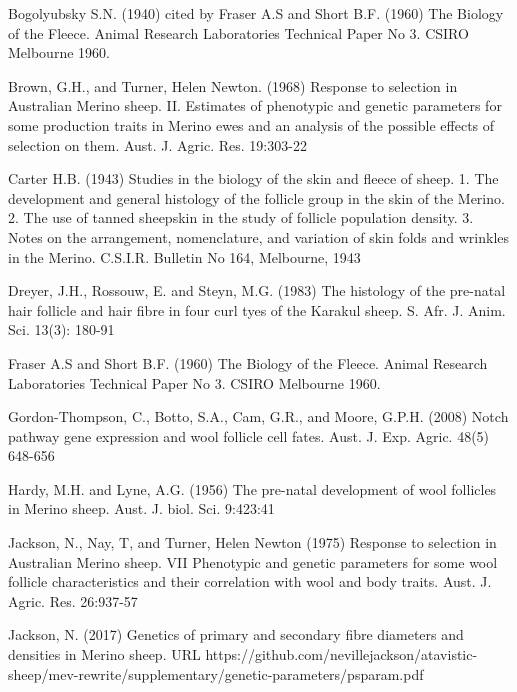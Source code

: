 \documentclass[titlepage]{article}  %
\begin{document}
\clearpage

\begin{thebibliography}{99}

 Bogolyubsky S.N. (1940) cited by Fraser A.S and Short B.F. (1960) The Biology of the Fleece. Animal Research Laboratories Technical Paper No 3. CSIRO Melbourne 1960.

Brown, G.H., and Turner, Helen Newton. (1968) Response to selection in Australian Merino sheep. II. Estimates of phenotypic and genetic parameters for some production traits in Merino ewes and an analysis of the possible effects of selection on them. Aust. J. Agric. Res. 19:303-22

Carter H.B. (1943) Studies in the biology of the skin and fleece of sheep. 1. The development and general histology of the follicle group in the skin of the Merino. 2. The use of tanned sheepskin in the study of follicle population density. 3. Notes on the arrangement, nomenclature, and variation of skin folds and wrinkles in the Merino. C.S.I.R. Bulletin No 164, Melbourne, 1943

Dreyer, J.H., Rossouw, E. and Steyn, M.G. (1983) The histology of the pre-natal hair follicle and hair fibre in four curl tyes of the Karakul sheep.  S. Afr. J. Anim. Sci. 13(3): 180-91

Fraser A.S and Short B.F. (1960) The Biology of the Fleece. Animal Research Laboratories Technical Paper No 3. CSIRO Melbourne 1960.

Gordon-Thompson, C., Botto, S.A., Cam, G.R., and Moore, G.P.H. (2008) Notch pathway gene expression and wool follicle cell fates. Aust. J. Exp. Agric. 48(5) 648-656

Hardy, M.H. and Lyne, A.G. (1956) The pre-natal development of wool follicles in Merino sheep. Aust. J. biol. Sci. 9:423:41

Jackson, N., Nay, T, and Turner, Helen Newton (1975) Response to selection in Australian Merino sheep. VII Phenotypic and genetic parameters for some wool follicle characteristics and their correlation with wool and body traits. Aust. J. Agric. Res. 26:937-57

Jackson, N. (2017) Genetics of primary and secondary fibre diameters and densities in Merino sheep. URL https://github.com/nevillejackson/atavistic-sheep/mev-rewrite/supplementary/genetic-parameters/psparam.pdf


\end{thebibliography}
\end{document}
